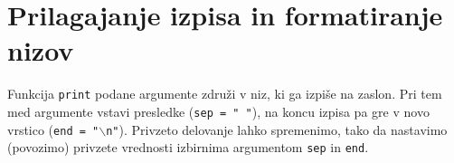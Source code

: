 
\section{Prilagajanje izpisa in formatiranje nizov}

Funkcija \texttt{print} podane argumente združi v niz, ki ga izpiše na zaslon. Pri tem med argumente vstavi presledke (\texttt{sep = " "}), na koncu izpisa pa gre v novo vrstico (\texttt{end = "$\backslash$n"}). Privzeto delovanje lahko spremenimo, tako da nastavimo (povozimo) privzete vrednosti izbirnima argumentom \texttt{sep} in \texttt{end}. 

